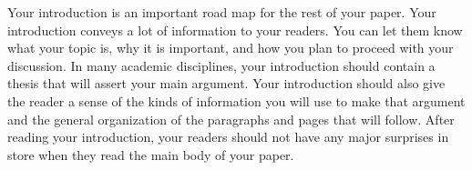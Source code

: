 Your introduction is an important road map for the rest of your paper. Your introduction conveys a lot of information to your readers. You can let them know what your topic is, why it is important, and how you plan to proceed with your discussion. In many academic disciplines, your introduction should contain a thesis that will assert your main argument. Your introduction should also give the reader a sense of the kinds of information you will use to make that argument and the general organization of the paragraphs and pages that will follow. After reading your introduction, your readers should not have any major surprises in store when they read the main body of your paper.